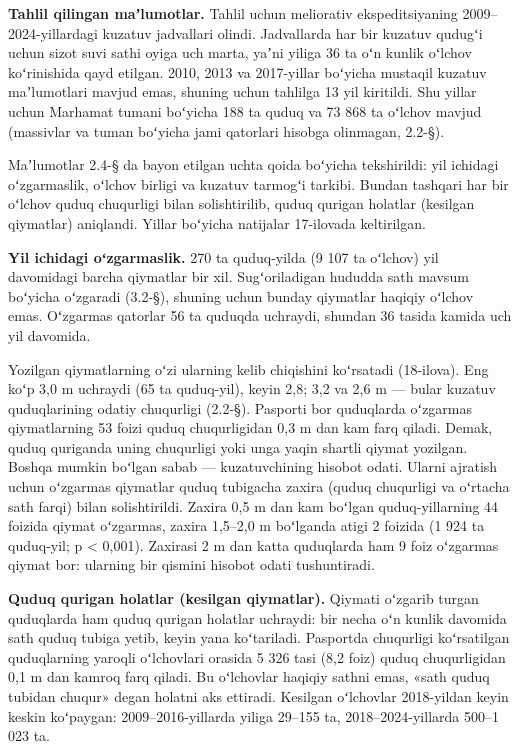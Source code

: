 
\textbf{Tahlil qilingan maʼlumotlar.} Tahlil uchun meliorativ
ekspeditsiyaning 2009--2024-yillardagi kuzatuv jadvallari olindi.
Jadvallarda har bir kuzatuv qudugʻi uchun sizot suvi sathi oyiga uch
marta, yaʼni yiliga 36 ta oʻn kunlik oʻlchov koʻrinishida qayd etilgan.
2010, 2013 va 2017-yillar boʻyicha mustaqil kuzatuv maʼlumotlari mavjud
emas, shuning uchun tahlilga 13 yil kiritildi. Shu yillar uchun Marhamat
tumani boʻyicha 188 ta quduq va 73 868 ta oʻlchov mavjud (massivlar va
tuman boʻyicha jami qatorlari hisobga olinmagan, 2.2-§).

Maʼlumotlar 2.4-§ da bayon etilgan uchta qoida boʻyicha tekshirildi: yil
ichidagi oʻzgarmaslik, oʻlchov birligi va kuzatuv tarmogʻi tarkibi.
Bundan tashqari har bir oʻlchov quduq chuqurligi bilan solishtirilib,
quduq qurigan holatlar (kesilgan qiymatlar) aniqlandi. Yillar boʻyicha
natijalar 17-ilovada keltirilgan.

\textbf{Yil ichidagi oʻzgarmaslik.} 270 ta quduq-yilda (9 107 ta
oʻlchov) yil davomidagi barcha qiymatlar bir xil. Sugʻoriladigan hududda
sath mavsum boʻyicha oʻzgaradi (3.2-§), shuning uchun bunday qiymatlar
haqiqiy oʻlchov emas. Oʻzgarmas qatorlar 56 ta quduqda uchraydi, shundan
36 tasida kamida uch yil davomida.

Yozilgan qiymatlarning oʻzi ularning kelib chiqishini koʻrsatadi
(18-ilova). Eng koʻp 3,0 m uchraydi (65 ta quduq-yil), keyin 2,8; 3,2 va
2,6 m --- bular kuzatuv quduqlarining odatiy chuqurligi (2.2-§).
Pasporti bor quduqlarda oʻzgarmas qiymatlarning 53 foizi quduq
chuqurligidan 0,3 m dan kam farq qiladi. Demak, quduq quriganda uning
chuqurligi yoki unga yaqin shartli qiymat yozilgan. Boshqa mumkin
boʻlgan sabab --- kuzatuvchining hisobot odati. Ularni ajratish uchun
oʻzgarmas qiymatlar quduq tubigacha zaxira (quduq chuqurligi va oʻrtacha
sath farqi) bilan solishtirildi. Zaxira 0,5 m dan kam boʻlgan
quduq-yillarning 44 foizida qiymat oʻzgarmas, zaxira 1,5--2,0 m
boʻlganda atigi 2 foizida (1 924 ta quduq-yil; p \textless{} 0,001).
Zaxirasi 2 m dan katta quduqlarda ham 9 foiz oʻzgarmas qiymat bor:
ularning bir qismini hisobot odati tushuntiradi.

\textbf{Quduq qurigan holatlar (kesilgan qiymatlar).} Qiymati oʻzgarib
turgan quduqlarda ham quduq qurigan holatlar uchraydi: bir necha oʻn
kunlik davomida sath quduq tubiga yetib, keyin yana koʻtariladi.
Pasportda chuqurligi koʻrsatilgan quduqlarning yaroqli oʻlchovlari
orasida 5 326 tasi (8,2 foiz) quduq chuqurligidan 0,1 m dan kamroq farq
qiladi. Bu oʻlchovlar haqiqiy sathni emas, «sath quduq tubidan chuqur»
degan holatni aks ettiradi. Kesilgan oʻlchovlar 2018-yildan keyin keskin
koʻpaygan: 2009--2016-yillarda yiliga 29--155 ta, 2018--2024-yillarda
500--1 023 ta.

